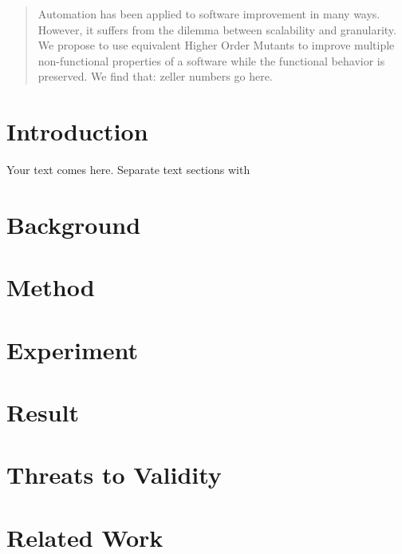 \date{Received: date / Accepted: date}


\maketitle

\begin{abstract}
Automation has been applied to software improvement in many ways.
However, it suffers from the dilemma between scalability and granularity.
We propose to use equivalent Higher Order Mutants to improve multiple non-functional properties of a software while the functional behavior is preserved.
We find that: zeller numbers go here.
\end{abstract}

\section{Introduction}
\label{sec_intro}
Your text comes here. Separate text sections with


\section{Background}
\label{sec_back}

\section{Method}
\label{sec_method}

\section{Experiment}
\label{sec_exp}

\section{Result}
\label{sec_result}

\section{Threats to Validity}
\label{sec_threat}

\section{Related Work}
\label{sec_related}


